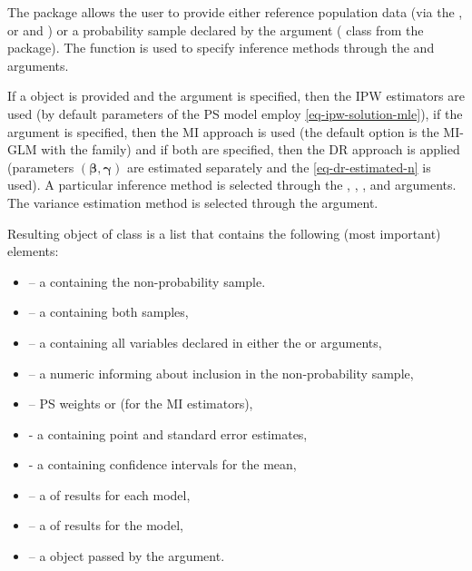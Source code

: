 \documentclass[
]{jss}
\begin{document}
The package allows the user to provide either reference population data
(via the , or  and )
or a probability sample declared by the  argument
( class from the  package). The
 function is used to specify inference methods through the
 and  arguments.

If a  object is provided and the 
argument is specified, then the IPW estimators are used (by default
parameters of the PS model employ \eqref{eq-ipw-solution-mle}), if the
 argument is specified, then the MI approach is used (the
default option is the MI-GLM with the  family) and if
both are specified, then the DR approach is applied (parameters
\((\boldsymbol{\beta}, \boldsymbol{\gamma})\) are estimated separately
and the \eqref{eq-dr-estimated-n} is used). A particular inference
method is selected through the ,
, ,
 and  arguments. The
variance estimation method is selected through the
 argument.

Resulting object of class  is a list that contains the
following (most important) elements:

\begin{itemize}
\item {} -- a  containing the non-probability sample.
\item {} -- a  containing both samples,
\item {} -- a  containing all variables declared in either the  or  arguments,
\item {} -- a numeric  informing about inclusion in the non-probability sample,
\item {} -- PS weights or  (for the MI estimators),
\item {} - a  containing point and standard error estimates,
\item {} - a  containing confidence intervals for the mean,
\item {} -- a  of results for each  model,
\item {} -- a  of results for the  model,
\item {} -- a  object passed by the  argument.
\end{itemize}
\end{document}
